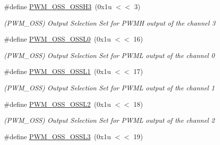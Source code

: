 \begin{DoxyCompactItemize}
\mbox{\label{group__SAMV71__PWM_gac3dd2a5be39e742b7fb03897a7469460}} 
\#define \mbox{\hyperlink{group__SAMV71__PWM_gac3dd2a5be39e742b7fb03897a7469460}{P\+W\+M\+\_\+\+O\+S\+S\+\_\+\+O\+S\+S\+H3}}~(0x1u $<$$<$ 3)
\begin{DoxyCompactList}\small\item\em (P\+W\+M\+\_\+\+O\+SS) Output Selection Set for P\+W\+MH output of the channel 3 \end{DoxyCompactList}\item 
\mbox{\label{group__SAMV71__PWM_gaaf27227163d1b122a0851ec9e8ca8675}} 
\#define \mbox{\hyperlink{group__SAMV71__PWM_gaaf27227163d1b122a0851ec9e8ca8675}{P\+W\+M\+\_\+\+O\+S\+S\+\_\+\+O\+S\+S\+L0}}~(0x1u $<$$<$ 16)
\begin{DoxyCompactList}\small\item\em (P\+W\+M\+\_\+\+O\+SS) Output Selection Set for P\+W\+ML output of the channel 0 \end{DoxyCompactList}\item 
\mbox{\label{group__SAMV71__PWM_ga7d2aa22a2ea9308f31791f9df7d568df}} 
\#define \mbox{\hyperlink{group__SAMV71__PWM_ga7d2aa22a2ea9308f31791f9df7d568df}{P\+W\+M\+\_\+\+O\+S\+S\+\_\+\+O\+S\+S\+L1}}~(0x1u $<$$<$ 17)
\begin{DoxyCompactList}\small\item\em (P\+W\+M\+\_\+\+O\+SS) Output Selection Set for P\+W\+ML output of the channel 1 \end{DoxyCompactList}\item 
\mbox{\label{group__SAMV71__PWM_ga17b4e9807df91f7e90f0137b1af1b411}} 
\#define \mbox{\hyperlink{group__SAMV71__PWM_ga17b4e9807df91f7e90f0137b1af1b411}{P\+W\+M\+\_\+\+O\+S\+S\+\_\+\+O\+S\+S\+L2}}~(0x1u $<$$<$ 18)
\begin{DoxyCompactList}\small\item\em (P\+W\+M\+\_\+\+O\+SS) Output Selection Set for P\+W\+ML output of the channel 2 \end{DoxyCompactList}\item 
\mbox{\label{group__SAMV71__PWM_ga449887747a9e6596f5ae12b16018d485}} 
\#define \mbox{\hyperlink{group__SAMV71__PWM_ga449887747a9e6596f5ae12b16018d485}{P\+W\+M\+\_\+\+O\+S\+S\+\_\+\+O\+S\+S\+L3}}~(0x1u $<$$<$ 19)
$$
\end{DoxyCompactItemize}
